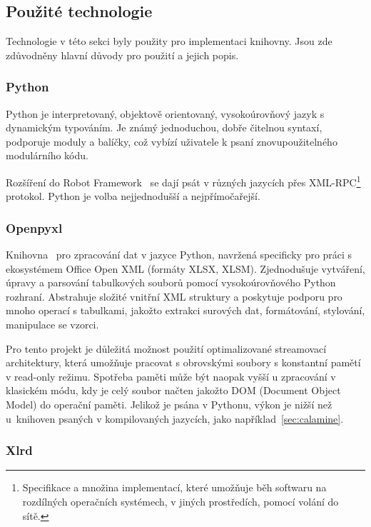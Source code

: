 \subsection{Použité technologie}

Technologie v této sekci byly použity pro implementaci knihovny. Jsou zde zdůvodněny hlavní důvody pro použití a jejich popis.

\subsubsection{Python}

Python je interpretovaný, objektově orientovaný, vysokoúrovňový jazyk s dynamickým typováním. Je známý jednoduchou, dobře čitelnou syntaxí, podporuje moduly a balíčky, což vybízí uživatele k psaní znovupoužitelného modulárního kódu.~\cite{WhyPython}

Rozšíření do Robot Framework~\cite{robotframeworkUserGuide} se dají psát v různých jazycích přes XML-RPC\footnote{Specifikace a množina implementací, které umožňuje běh softwaru na rozdílných operačních systémech, v jiných prostředích, pomocí volání do sítě.} protokol. Python je volba nejjednodušší a nejpřímočařejší.

\subsubsection{Openpyxl}

Knihovna~\cite{Openpyxl} pro zpracování dat v jazyce Python, navržená specificky pro práci s ekosystémem Office Open XML (formáty XLSX, XLSM). Zjednodušuje vytváření, úpravy a parsování tabulkových souborů pomocí vysokoúrovňového Python rozhraní. Abstrahuje složité vnitřní XML struktury a poskytuje podporu pro mnoho operací s tabulkami, jakožto extrakci surových dat, formátování, stylování, manipulace se vzorci.

Pro tento projekt je důležitá možnost použití optimalizované streamovací architektury, která umožňuje pracovat s obrovskými soubory s konstantní pamětí v read-only režimu. Spotřeba paměti může být naopak vyšší u zpracování v klasickém módu, kdy je celý soubor načten jakožto DOM (Document Object Model) do operační paměti. Jelikož je psána v Pythonu, výkon je nižší než u~knihoven psaných v kompilovaných jazycích, jako například~\ref{sec:calamine}.

\subsubsection{Xlrd}
\label{xlrd}


